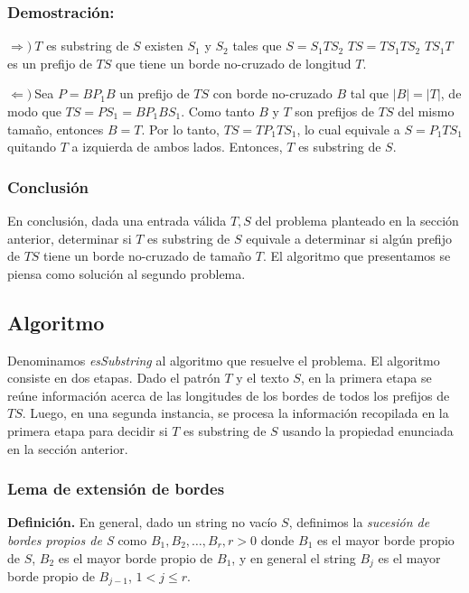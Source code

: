 \subsubsection{Demostración:}

$\Longrightarrow) \ $$T$ es substring de $S$ \spaciousimply existen $S_1$ y $S_2$ tales que $S = S_1 T S_2$ \spaciousimply $TS = T S_1 T S_2$ \spaciousimply $T S_1 T$ es un prefijo de $TS$ que tiene un borde no-cruzado de longitud $T$.

$\Longleftarrow) \ $Sea $P = B P_1 B$ un prefijo de $TS$ con borde no-cruzado $B$ tal que $|B| = |T|$, de modo que $TS = P S_1 = B P_1 B S_1$. Como tanto $B$ y $T$ son prefijos de $TS$ del mismo tamaño, entonces $B = T$. Por lo tanto, $TS = T P_1 T S_1$, lo cual equivale a $S = P_1 T S_1$ quitando $T$ a izquierda de ambos lados. Entonces, $T$ es substring de $S$.

\subsubsection{Conclusión}

En conclusión, dada una entrada válida $T, S$ del problema planteado en la sección anterior, determinar si $T$ es substring de $S$ equivale a determinar si algún prefijo de $TS$ tiene un borde no-cruzado de tamaño $T$. El algoritmo que presentamos se piensa como solución al segundo problema.

\subsection{Algoritmo}

Denominamos \textit{esSubstring} al algoritmo que resuelve el problema. El algoritmo consiste en dos etapas. Dado el patrón $T$ y el texto $S$, en la primera etapa se reúne información acerca de las longitudes de los bordes de todos los prefijos de $TS$. Luego, en una segunda instancia, se procesa la información recopilada en la primera etapa para decidir si $T$ es substring de $S$ usando la propiedad enunciada en la sección anterior.

\subsubsection{Lema de extensión de bordes}

\textbf{Definición.} En general, dado un string no vacío $S$, definimos la \textit{sucesión de bordes propios de S} como $B_1, B_2, \dots, B_r, r > 0$ donde $B_1$ es el mayor borde propio de $S$, $B_2$ es el mayor borde propio de $B_1$, y en general el string $B_j$ es el mayor borde propio de $B_{j-1}$, $1 < j \leq r$.

